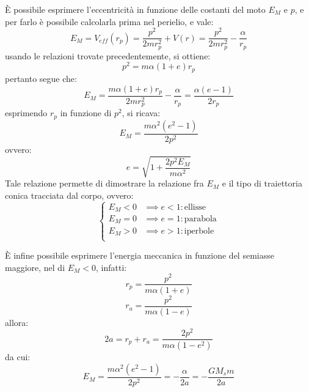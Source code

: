 \documentclass[11pt, a4paper, openright]{book}
\theoremstyle{plain}
\theoremstyle{definition}
\begin{document}
È possibile esprimere l'eccentricità in funzione delle costanti del moto $E_M$ e $p$, e per farlo è possibile calcolarla prima nel perielio, e vale:
\begin{equation}
    E_M = V_{eff}(r_p) = \frac{p^2}{2mr^2_p} + V(r) = \frac{p^2}{2mr^2_p} - \frac{\alpha}{r_p}
\end{equation}
usando le relazioni trovate precedentemente, si ottiene:
\begin{equation}
    p^2 = m\alpha(1 + e)r_p
\end{equation}
pertanto segue che:
\begin{equation}
    E_M = \frac{m\alpha(1 + e)r_p}{2mr_p^2} - \frac{\alpha}{r_p} = \frac{\alpha(e - 1)}{2r_p}
\end{equation}
esprimendo $r_p$ in funzione di $p^2$, si ricava:
\begin{equation}
    E_M = \frac{m\alpha^2(e^2 - 1)}{2p^2}
\end{equation}
ovvero:
\begin{equation}
    e = \sqrt{1 + \frac{2p^2E_M}{m\alpha^2}}
\end{equation}
Tale relazione permette di dimostrare la relazione fra $E_M$ e il tipo di traiettoria conica tracciata dal corpo, ovvero:
\begin{equation}
    \begin{cases}
        E_M < 0 & \implies e < 1: \text{ellisse} \\
        E_M = 0 & \implies e = 1: \text{parabola} \\
        E_M > 0 & \implies e > 1: \text{iperbole} \\
    \end{cases}
\end{equation}

È infine possibile esprimere l'energia meccanica in funzione del semiasse maggiore, nel di $E_M < 0$, infatti:
\begin{equation}
    r_p = \frac{p^2}{m\alpha(1 + e)}
\end{equation} 
\begin{equation}
    r_a = \frac{p^2}{m\alpha(1 - e)}
\end{equation} 
allora:
\begin{equation}
    2a = r_p + r_a = \frac{2p^2}{m\alpha(1 - e^2)}
\end{equation}
da cui:
\begin{equation}
    E_M = \frac{m\alpha^2(e^2 - 1)}{2p^2} = -\frac{\alpha}{2a} = -\frac{GM_sm}{2a}
\end{equation}
\end{document}
